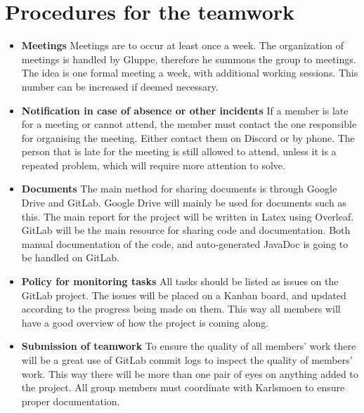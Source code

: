 \documentclass{article}
\begin{document}
\section{Procedures for the teamwork}
\begin{itemize}
    \item \textbf{Meetings} \newline Meetings are to occur at least once a week. The organization of meetings is handled by Gluppe, therefore he summons the group to meetings. The idea is one formal meeting a week, with additional working sessions. This number can be increased if deemed necessary.
    \item \textbf{Notification in case of absence or other incidents} \newline If a member is late for a meeting or cannot attend, the member must contact the one responsible for organising the meeting. Either contact them on Discord or by phone. The person that is late for the meeting is still allowed to attend, unless it is a repeated problem, which will require more attention to solve. 
    \item \textbf{Documents} \newline The main method for sharing documents is through Google Drive and GitLab. Google Drive will mainly be used for documents such as this. The main report for the project will be written in Latex using Overleaf. GitLab will be the main resource for sharing code and documentation. Both manual documentation of the code, and auto-generated JavaDoc is going to be handled on GitLab.
    \item \textbf{Policy for monitoring tasks} \newline All tasks should be listed as issues on the GitLab project. The issues will be placed on a Kanban board, and updated according to the progress being made on them. This way all members will have a good overview of how the project is coming along. 
    \item \textbf{Submission of teamwork} \newline To ensure the quality of all members' work there will be a great use of GitLab commit logs to inspect the quality of members’ work. This way there will be more than one pair of eyes on anything added to the project. All group members must coordinate with Karlsmoen to ensure proper documentation. 
\end{itemize}
\end{document}
